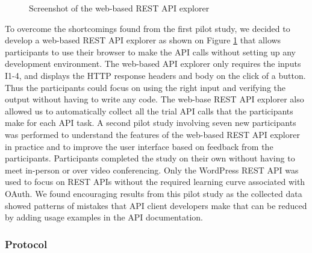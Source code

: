 \documentclass[conference]{IEEEtran}
\begin{document}
\begin{figure}[t]
\begin{center}
\end{center}
\caption{Screenshot of the web-based REST API explorer}
\label{fig:api_explorer}
\end{figure}

To overcome the shortcomings found from the first pilot study, we decided to develop a web-based REST API explorer as shown on Figure \ref{fig:api_explorer} that allows participants to use their browser to make the API calls without setting up any development environment. The web-based API explorer only requires the inputs I1-4, and displays the HTTP response headers and body on the click of a button. Thus the participants could focus on using the right input and verifying the output without having to write any code. The web-base REST API explorer also allowed us to automatically collect all the trial API calls that the participants make for each API task. A second pilot study involving seven new participants was performed to understand the features of the web-based REST API explorer in practice and to improve the user interface based on feedback from the participants. Participants completed the study on their own without having to meet in-person or over video conferencing. Only the WordPress REST API was used to focus on REST APIs without the required learning curve associated with OAuth. We found encouraging results from this pilot study as the collected data showed patterns of mistakes that API client developers make that can be reduced by adding usage examples in the API documentation.

\subsubsection{Protocol}
\end{document}
